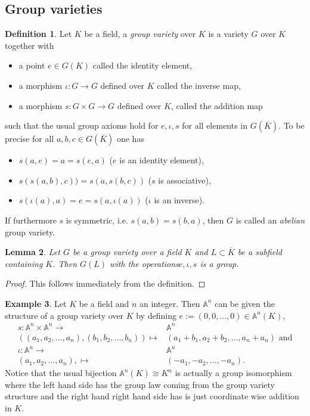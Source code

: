 \documentclass[a4paper,12pt,reqno]{amsart}
\newcommand{\field}[1]{\mathbb{#1}}  %
\newcommand{\A}{\field{A}}
\newtheorem{lemma}{Lemma}
\theoremstyle{definition}
\newtheorem{definition}[lemma]{Definition}
\newtheorem{example}[lemma]{Example}
\numberwithin{lemma}{section}
\numberwithin{equation}{section}
\numberwithin{figure}{section}
\begin{document}
\subsection{Group varieties}
\begin{definition}\label{def:group-variety}
Let $K$ be a field, a \textit{group variety} over $K$ is a variety $G$ over $K$ together with 
\begin{itemize}
	\item a point $e \in G(K)$ called the identity element,
	\item a morphism $\iota: G \to G$ defined over $K$ called the inverse map,
	\item a morphism $s: G \times G \to G$ defined over $K$, called the addition map
\end{itemize}
such that the usual group axioms hold for $e, \iota, s$ for all elements in $G(\overline K)$. To be precise for all $a,b,c \in G(\overline K)$ one has
\begin{itemize}
	\item $s(a,e)=a = s(e,a)$ ($e$ is an identity element),
	\item $s(s(a,b),c)) = s(a,s(b,c))$ ($s$ is associative),
	\item $s(\iota(a),a) = e = s(a, \iota(a))$ ($\iota$ is an inverse).
\end{itemize}
If furthermore $s$ is symmetric, i.e. $s(a,b)=s(b,a)$, then $G$ is called an \textit{abelian} group variety.
\end{definition}

\begin{lemma}\label{stmt:group-structure-on-group-variety}
	Let $G$ be a group variety over a field $K$ and $L\subset \overline K$ be a subfield containing $K$. Then $G(L)$ with the operations$e,\iota, s$ is a group.
\end{lemma}
\begin{proof}
	This follows immediately from the definition.
\end{proof}

\begin{example}
Let $K$ be a field and $n$ an integer. Then $\A^n$ can be given the structure of a group variety over $K$ by defining $e:=(0,0,\ldots,0) \in \A^n(K)$, 
\begin{align}
s \colon  \A^n \times \A^n \to& \A^n \\
((a_1,a_2,\ldots, a_n),(b_1,b_2,\ldots, b_n)) \mapsto& (a_1+b_1,a_2+b_2,\ldots, a_n+a_n) \text{ and} \\
\iota \colon  \A^n  \to& \A^n \\
(a_1,a_2,\ldots, a_n), \mapsto& (-a_1,-a_2,\ldots, -a_n).
\end{align}
Notice that the usual bijection $\A^n(K) \cong K^n$ is actually a group isomorphism where the left hand side has the group law coming from the group variety structure and the right hand right hand side has is just coordinate wise addition in $K$.
\end{example}
\end{document}
